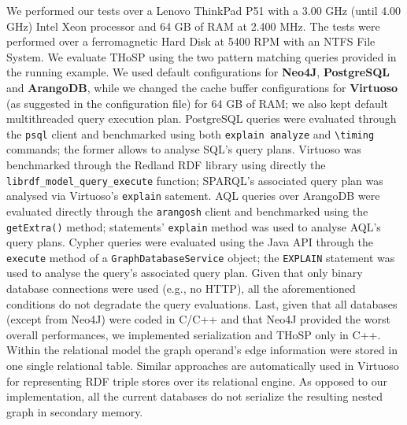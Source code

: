 We performed our tests over a Lenovo ThinkPad P51 with a 3.00 GHz (until 4.00 GHz) Intel Xeon processor and 64 GB of RAM at 2.400 MHz. The tests were performed over a ferromagnetic Hard Disk at 5400 RPM with an NTFS File System. We evaluate THoSP using the two pattern matching queries provided in the running example. 
We used default configurations for  \textbf{Neo4J}, \textbf{PostgreSQL} and \textbf{ArangoDB}, while we changed the cache buffer configurations for \textbf{Virtuoso} (as suggested in the configuration file) for 64 GB of RAM; we also kept  default multithreaded query execution plan. PostgreSQL queries were evaluated through the \texttt{psql} client and benchmarked using both \texttt{explain analyze} and \texttt{\textbackslash timing} commands; the former   allows to analyse SQL's query plans. Virtuoso was benchmarked through the Redland RDF library using directly the \texttt{librdf\_model\_query\_execute} function; SPARQL's associated query plan was analysed via Virtuoso's \texttt{explain} satement. 
AQL queries over {ArangoDB} were evaluated directly through the \texttt{arangosh} client and benchmarked using the \texttt{getExtra()} method; statements' \texttt{explain} method was used to analyse AQL's query plans. %
Cypher queries were evaluated using the Java API through the \texttt{execute} method of a \texttt{GraphDatabaseService} object; the \texttt{EX\-PLAIN} statement was used to analyse the query's associated query plan. Given that only binary database connections were used (e.g., no HTTP),
all the aforementioned conditions do not degradate the query evaluations. Last, given that all databases (except from Neo4J) were coded in C/C++ and that Neo4J provided the worst overall performances, we implemented  serialization and THoSP only in C++.
Within the relational model the graph operand's edge information were  stored in one single relational table. Similar approaches are automatically used in Virtuoso for representing RDF triple stores over its relational engine. As opposed to our implementation, all the current databases do not serialize the resulting nested graph in secondary memory.



